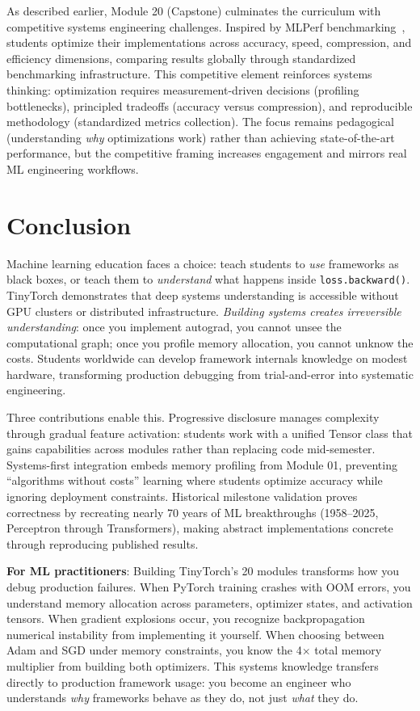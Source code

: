 \documentclass[10pt,twocolumn]{article}
\begin{document}
As described earlier, Module 20 (Capstone) culminates the curriculum with competitive systems engineering challenges. Inspired by MLPerf benchmarking~\citep{mattson2020mlperf, reddi2020}, students optimize their implementations across accuracy, speed, compression, and efficiency dimensions, comparing results globally through standardized benchmarking infrastructure. This competitive element reinforces systems thinking: optimization requires measurement-driven decisions (profiling bottlenecks), principled tradeoffs (accuracy versus compression), and reproducible methodology (standardized metrics collection). The focus remains pedagogical (understanding \emph{why} optimizations work) rather than achieving state-of-the-art performance, but the competitive framing increases engagement and mirrors real ML engineering workflows.

\section{Conclusion}
\label{sec:conclusion}

Machine learning education faces a choice: teach students to \emph{use} frameworks as black boxes, or teach them to \emph{understand} what happens inside \texttt{loss.backward()}. TinyTorch demonstrates that deep systems understanding is accessible without GPU clusters or distributed infrastructure. \emph{Building systems creates irreversible understanding}: once you implement autograd, you cannot unsee the computational graph; once you profile memory allocation, you cannot unknow the costs. Students worldwide can develop framework internals knowledge on modest hardware, transforming production debugging from trial-and-error into systematic engineering.

Three contributions enable this. Progressive disclosure manages complexity through gradual feature activation: students work with a unified Tensor class that gains capabilities across modules rather than replacing code mid-semester. Systems-first integration embeds memory profiling from Module 01, preventing ``algorithms without costs'' learning where students optimize accuracy while ignoring deployment constraints. Historical milestone validation proves correctness by recreating nearly 70 years of ML breakthroughs (1958--2025, Perceptron through Transformers), making abstract implementations concrete through reproducing published results.

\textbf{For ML practitioners}: Building TinyTorch's 20 modules transforms how you debug production failures. When PyTorch training crashes with OOM errors, you understand memory allocation across parameters, optimizer states, and activation tensors. When gradient explosions occur, you recognize backpropagation numerical instability from implementing it yourself. When choosing between Adam and SGD under memory constraints, you know the 4$\times$ total memory multiplier from building both optimizers. This systems knowledge transfers directly to production framework usage: you become an engineer who understands \emph{why} frameworks behave as they do, not just \emph{what} they do.
\end{document}
